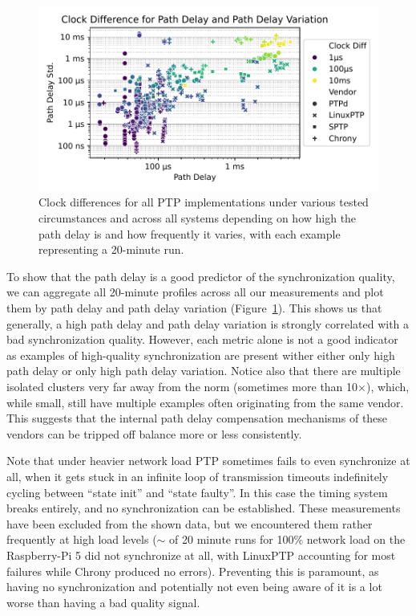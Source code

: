 \begin{figure}
    \includegraphics[width=\linewidth]{res/generated/base/clock_diff_by_path_delay.pdf}
    \caption{Clock differences for all PTP implementations under various tested circumstances and across all systems depending on how high the path delay is and how frequently it varies, with each example representing a 20-minute run.}
    \label{fig:path-delay-all}
\end{figure}

To show that the path delay is a good predictor of the synchronization quality, we can aggregate all 20-minute profiles across all our measurements and plot them by path delay and path delay variation (Figure~\ref{fig:path-delay-all}). This shows us that generally, a high path delay and path delay variation is strongly correlated with a bad synchronization quality. However, each metric alone is not a good indicator as examples of high-quality synchronization are present wither either only high path delay or only high path delay variation. Notice also that there are multiple isolated clusters very far away from the norm (sometimes more than 10$\times$), which, while small, still have multiple examples often originating from the same vendor. This suggests that the internal path delay compensation mechanisms of these vendors can be tripped off balance more or less consistently.

\newcommand{\loadFaultyNumFailures}{9}
\newcommand{\loadFaultyNumTrials}{34}
Note that under heavier network load PTP sometimes fails to even synchronize at all, when it gets stuck in an infinite loop of transmission timeouts indefinitely cycling between ``state init'' and ``state faulty''. In this case the timing system breaks entirely, and no synchronization can be established. These measurements have been excluded from the shown data, but we encountered them rather frequently at high load levels ($\sim$\fPercentage{\loadFaultyNumFailures/\loadFaultyNumTrials} of 20 minute runs for 100\% network load on the Raspberry-Pi 5 did not synchronize at all, with LinuxPTP accounting for most failures while Chrony produced no errors). Preventing this is paramount, as having no synchronization and potentially not even being aware of it is a lot worse than having a bad quality signal.

